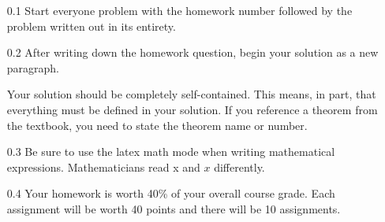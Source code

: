 \documentclass[12pt]{article}
\begin{document}
\pagestyle{fancy}  \chead{\textcolor{red}{02/25/2019}}
\rhead{\textcolor{red}{Austin Klum}} 
\lfoot{} \cfoot{} \rfoot{}

\begin{enumerate}
    \item[0.1] Start everyone problem with the homework number followed by the problem written out in its entirety. 
    \item[0.2] After writing down the homework question, begin your solution as a new paragraph. 
    
    \noindent Your solution should be completely self-contained. This means, in part, that everything must be defined in your solution. If you reference a theorem from the textbook, you need to state the theorem name or number.
    
    \item[0.3] Be sure to use the latex math mode when writing mathematical expressions. Mathematicians read x and $x$ differently. 
    
    \item[0.4] Your homework is worth 40\% of your overall course grade. Each assignment will be worth 40 points and there will be 10 assignments. 
    

\end{enumerate}
\end{document}
